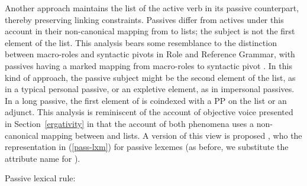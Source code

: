 \documentclass[output=paper
 	        ,biblatex
                ,babelshorthands
                ,newtxmath
                ,draftmode
                ,colorlinks, citecolor=brown
]{langscibook}
\begin{document}
Another approach maintains the \argst list of the active verb in its passive counterpart, thereby preserving linking constraints.
Passives differ from actives under this account in their non-canonical mapping from \argst to  lists; the subject is not the first element of the \argst list. This analysis bears some resemblance to the distinction between macro-roles and syntactic pivots in Role and Reference Grammar, with passives having a marked mapping from macro-roles to syntactic pivot \citep{VanValinandLapolla1997}.  
In this kind of approach, the passive subject might be the second element of the \argst list, as in a typical personal passive, or an expletive element, as in impersonal passives.
In a long passive, the first element of \argst is coindexed with a PP on the  list or an adjunct.
This analysis is reminiscent of the account of  objective voice presented in Section~\ref{ergativity} in that the account of both phenomena uses a non-canonical mapping between \argst and  lists.
A version of this view is proposed  \citet[241]{Davis2001}, who \skp[2] the representation in (\ref{pass-lxm}) for passive lexemes (as before, we substitute the attribute name  for ).

\ea
\label{pass-lxm}
Passive lexical rule:\\
\z
\end{document}
